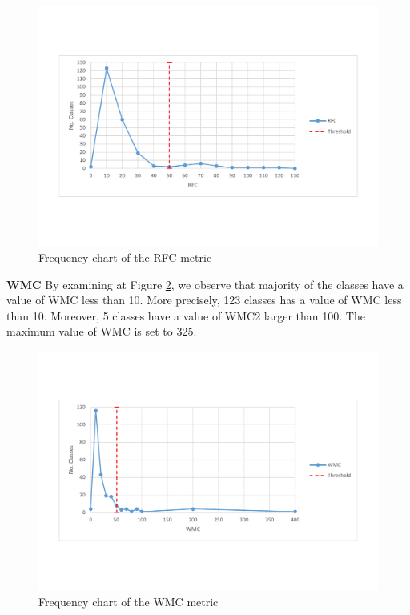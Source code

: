 \begin{figure}[ht!]
	\centering
	\includegraphics[width=\textwidth]{images/threshold/rfc.pdf}
	\caption{Frequency chart of the RFC metric}
	\label{fig:rfcdistribution}
\end{figure}

\textbf{WMC} By examining at Figure \ref{fig:wmcdistribution}, we observe that majority of the classes have a value of WMC less than 10. More precisely, 123 classes has a value of WMC less than 10. Moreover, 5 classes have a value of WMC2 larger than 100. The maximum value of WMC is set to 325.

\begin{figure}[ht!]
	\centering
	\includegraphics[width=\textwidth]{images/threshold/wmc.pdf}
	\caption{Frequency chart of the WMC metric}
	\label{fig:wmcdistribution}
\end{figure}

